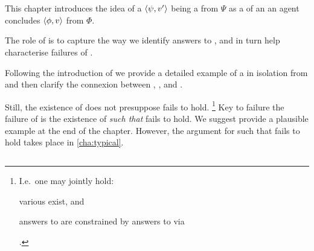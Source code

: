 \chapter{}
\label{cha:requs}

\begin{note}
  This chapter introduces the idea of a \(\langle\psi, v'\rangle\) being a \fc{} from \(\Psi\) as a  of an  an agent concludes \(\langle\phi, v\rangle\) from \(\Phi\).

  The role of  is to capture the way we identify answers to \qWhy{}, and in turn help characterise failures of \issueInclusion{}.

  Following the introduction of  we provide a detailed example of a  in isolation from \issueInclusion{} and then clarify the connexion between , \qWhy{}, and \issueInclusion{}.

  Still, the existence of  does not presuppose \issueInclusion{} fails to hold.%
  \footnote{
    I.e.\ one may jointly hold:
    \begin{enumerate*}[label=(\alph*)]
    \item
      various  exist, and
    \item
      answers to \qWhy{} are constrained by answers to \qHow{} via \issueInclusion{}
    \end{enumerate*}%
    .
  }
  Key to failure the failure of \issueInclusion{} is the existence of  \emph{such that} \issueInclusion{} fails to hold.
  We suggest provide a plausible example at the end of the chapter.
  However, the argument for  such that \issueInclusion{} fails to hold takes place in \autoref{cha:typical}.
\end{note}



\section{}
\label{cha:requs:requs}

